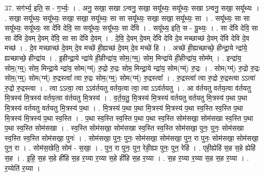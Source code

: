 \documentclass[17pt]{extarticle}
\begin{document}
37. सग॑र्भ्य॒ इति॒ स - ग॒र्भ्यः॒ । . अनु॒ सखा॒ सखा ऽन्वनु॒ सखा॒ सयू᳚थ्यः॒ सयू᳚थ्यः॒ सखा ऽन्वनु॒ सखा॒ सयू᳚थ्यः । . सखा॒ सयू᳚थ्यः॒ सयू᳚थ्यः॒ सखा॒ सखा॒ सयू᳚थ्यः॒ सा सा सयू᳚थ्यः॒ सखा॒ सखा॒ सयू᳚थ्यः॒ सा । . सयू᳚थ्यः॒ सा सा सयू᳚थ्यः॒ सयू᳚थ्यः॒ सा दे॑वि देवि॒ सा सयू᳚थ्यः॒ सयू᳚थ्यः॒ सा दे॑वि । . सयू᳚थ्य॒ इति॒ स - यू॒थ्यः॒ । . सा दे॑वि देवि॒ सा सा दे॑वि दे॒वम् दे॒वम् दे॑वि॒ सा सा दे॑वि दे॒वम् । . दे॒वि॒ दे॒वम् दे॒वम् दे॑वि देवि दे॒व मच्छाच्छ॑ दे॒वम् दे॑वि देवि दे॒व मच्छ॑ । . दे॒व मच्छाच्छ॑ दे॒वम् दे॒व मच्छे॑ ही॒ह्यच्छ॑ दे॒वम् दे॒व मच्छे॑ हि । . अच्छे॑ ही॒ह्यच्छाच्छे॒ हीन्द्रा॒ये न्द्रा॑ये॒ ह्यच्छाच्छे॒ हीन्द्रा॑य । . इ॒हीन्द्रा॒ये न्द्रा॑ये ही॒हीन्द्रा॑य॒ सोम॒(ग्म्॒) सोम॒ मिन्द्रा॑ये ही॒हीन्द्रा॑य॒ सोम᳚म् । . इन्द्रा॑य॒ सोम॒(ग्म्॒) सोम॒ मिन्द्रा॒ये न्द्रा॑य॒ सोम(ग्म्॑) रु॒द्रो रु॒द्रः सोम॒ मिन्द्रा॒ये न्द्रा॑य॒ सोम(ग्म्॑) रु॒द्रः । . सोम(ग्म्॑) रु॒द्रो रु॒द्रः सोम॒(ग्म्॒) सोम(ग्म्॑) रु॒द्रस्त्वा᳚ त्वा रु॒द्रः सोम॒(ग्म्॒) सोम(ग्म्॑) रु॒द्रस्त्वा᳚ । . रु॒द्रस्त्वा᳚ त्वा रु॒द्रो रु॒द्रस्त्वा ऽऽत्वा॑ रु॒द्रो रु॒द्रस्त्वा । . त्वा ऽऽत्वा॒ त्वा ऽऽव॑र्तयतु वर्तय॒त्वा त्वा॒ त्वा ऽऽव॑र्तयतु । . आ व॑र्तयतु वर्तय॒त्वा व॑र्तयतु मि॒त्रस्य॑ मि॒त्रस्य॑ वर्तय॒त्वा व॑र्तयतु मि॒त्रस्य॑ । . व॒र्त॒य॒तु॒ मि॒त्रस्य॑ मि॒त्रस्य॑ वर्तयतु वर्तयतु मि॒त्रस्य॑ प॒था प॒था मि॒त्रस्य॑ वर्तयतु वर्तयतु मि॒त्रस्य॑ प॒था । . मि॒त्रस्य॑ प॒था प॒था मि॒त्रस्य॑ मि॒त्रस्य॑ प॒था स्व॒स्ति स्व॒स्ति प॒था मि॒त्रस्य॑ मि॒त्रस्य॑ प॒था स्व॒स्ति । . प॒था स्व॒स्ति स्व॒स्ति प॒था प॒था स्व॒स्ति सोम॑सखा॒ सोम॑सखा स्व॒स्ति प॒था प॒था स्व॒स्ति सोम॑सखा । . स्व॒स्ति सोम॑सखा॒ सोम॑सखा स्व॒स्ति स्व॒स्ति सोम॑सखा॒ पुनः॒ पुनः॒ सोम॑सखा स्व॒स्ति स्व॒स्ति सोम॑सखा॒ पुनः॑ । . सोम॑सखा॒ पुनः॒ पुनः॒ सोम॑सखा॒ सोम॑सखा॒ पुन॒ रा पुनः॒ सोम॑सखा॒ सोम॑सखा॒ पुन॒ रा । . सोम॑स॒खेति॒ सोम॑ - स॒खा॒ । . पुन॒ रा पुनः॒ पुन॒ रेही॒ह्या पुनः॒ पुन॒ रेहि॑ । . एही॒ह्येहि॑ स॒ह स॒हे ह्येहि॑ स॒ह । . इ॒हि॒ स॒ह स॒हे ही॑हि स॒ह र॒य्या र॒य्या स॒हे ही॑हि स॒ह र॒य्या । . स॒ह र॒य्या र॒य्या स॒ह स॒ह र॒य्या । . र॒य्येति॑ र॒य्या । \newline
\pagebreak
{}
\end{document}

